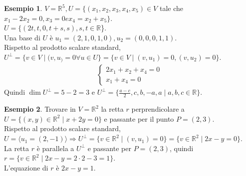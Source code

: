 \documentclass[a4paper]{article}
\theoremstyle{definition}
\newtheorem*{es}{Esempio}
\begin{document}
	\begin{es}
		$V = \mathbb{R}^5, U = \{(x_1, x_2, x_3, x_4, x_5) \in V$ tale che $x_1 - 2x_2 = 0, x_3 = 0 e x_4 = x_2 + x_5\}$. \\
		$U = \{(2t, t, 0, t + s, s), s, t \in \mathbb{R}$\}. \\
		Una base di $U$ è $u_1 = (2, 1, 0, 1, 0), u_2 = (0, 0, 0, 1, 1)$. \\
		Rispetto al prodotto scalare standard, $U^\perp = \{v \in V \mid (v, u_) = 0 \forall u \in U\} = \{v \in V \mid (v, u_1) = 0, (v, u_2) = 0\}$.
		\begin{align*}
			\begin{cases}
				2x_1 + x_2 + x_4 = 0 \\
				x_1 + x_4 = 0
			\end{cases}
		\end{align*}
		Quindi $\dim U^\perp = 5 - 2 = 3$ e $U^\perp = \{\frac{a - c}{2}, c, b, -a, a \mid a, b, c \in \mathbb{R}\}$.
	\end{es}

	\begin{es}
		Trovare in $V = \mathbb{R}^2$ la retta $r$ perprendicolare a $U = \{(x, y) \in \mathbb{R}^2 \mid x + 2y = 0\}$ e passante per il punto $P = (2, 3)$. \\
		Rispetto al prodotto scalare standard, $U = \langle u_1 = (2, -1) \rangle \Rightarrow U^\perp = \{v \in \mathbb{R}^2 \mid (v, u_1) = 0\} = \{v \in \mathbb{R}^2 \mid 2x - y = 0\}$. \\
		La retta $r$ è parallela a $U^\perp$ e passante per $P = (2, 3)$, quindi $r = \{v \in \mathbb{R}^2 \mid 2x - y = 2 \cdot 2 - 3 = 1\}$. \\
		L'equazione di $r$ è $2x - y = 1$.
	\end{es}
\end{document}
